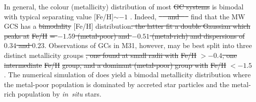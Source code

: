 \documentclass[a4paper,fleqn,usenatbib]{mnras}
\providecommand{\DIFadd}[1]{{\protect\color{blue}\uwave{#1}}} %
\providecommand{\DIFdel}[1]{{\protect\color{red}\sout{#1}}}                      %
\providecommand{\DIFaddbegin}{} %
\providecommand{\DIFaddend}{} %
\providecommand{\DIFdelbegin}{} %
\providecommand{\DIFdelend}{} %
\newcommand{\DIFscaledelfig}{0.5}
\newlength{\DIFdelgraphicswidth} %
\newlength{\DIFdelgraphicsheight} %
\newcommand{\DIFaddincludegraphics}[2][]{{\color{blue}\fbox{\DIFOincludegraphics[#1]{#2}}}} %
\newcommand{\DIFdelincludegraphics}[2][]{%
\sbox{\DIFdelgraphicsbox}{\DIFOincludegraphics[#1]{#2}}%
\settoboxwidth{\DIFdelgraphicswidth}{\DIFdelgraphicsbox} %
\settoboxtotalheight{\DIFdelgraphicsheight}{\DIFdelgraphicsbox} %
\scalebox{\DIFscaledelfig}{%
\parbox[b]{\DIFdelgraphicswidth}{\usebox{\DIFdelgraphicsbox}\\[-\baselineskip] \rule{\DIFdelgraphicswidth}{0em}}\llap{\resizebox{\DIFdelgraphicswidth}{\DIFdelgraphicsheight}{%
\setlength{\unitlength}{\DIFdelgraphicswidth}%
\begin{picture}(1,1)%
\thicklines\linethickness{2pt} %
{\color[rgb]{1,0,0}\put(0,0){\framebox(1,1){}}}%
{\color[rgb]{1,0,0}\put(0,0){\line( 1,1){1}}}%
{\color[rgb]{1,0,0}\put(0,1){\line(1,-1){1}}}%
\end{picture}%
}\hspace*{3pt}}} %
} %
\DeclareRobustCommand{\DIFaddbegin}{\DIFOaddbegin \let\includegraphics\DIFaddincludegraphics} %
\DeclareRobustCommand{\DIFaddend}{\DIFOaddend \let\includegraphics\DIFOincludegraphics} %
\DeclareRobustCommand{\DIFdelbegin}{\DIFOdelbegin \let\includegraphics\DIFdelincludegraphics} %
\DeclareRobustCommand{\DIFdelend}{\DIFOaddend \let\includegraphics\DIFOincludegraphics} %
\begin{document}
In general, the colour (metallicity) distribution of most \DIFdelbegin \DIFdel{GC systems }\DIFdelend \DIFaddbegin \DIFadd{GCSs }\DIFaddend is bimodal 
with typical separating value [Fe/H]$\sim -1$ \citep{1985ApJ...293..424Z,
1999AJ....118.1526G,2001AJ....121.2974L,2006ApJ...639...95P}. Indeed, 
\DIFdelbegin \DIFdel{\mbox{%
\citet[][p. 234]{1998gcs..book.....A} }\hspace{0pt}%
and \mbox{%
\citet[][p. 38]{Harris2001} }\hspace{0pt}%
}\DIFdelend \DIFaddbegin \DIFadd{\mbox{%
\citet{1998gcs..book.....A} }\hspace{0pt}%
and \mbox{%
\citet{Harris2001} }\hspace{0pt}%
}\DIFaddend find that the MW GCS has a 
\DIFdelbegin \DIFdel{bimodality }\DIFdelend \DIFaddbegin \DIFadd{bimodal }\DIFaddend [Fe/H] distribution\DIFdelbegin \DIFdel{: the latter fit a double Gaussian 
which peaks at }%
\DIFdel{Fe/H}%
\DIFdel{= $-1.59$ (metal-poor) and $-0.51$ (metal-rich) and 
dispersions of $0.34$ and $0.23$}\DIFdelend . Observations of GCs in M31, however, may be best 
split into three distinct metallicity groups \DIFdelbegin \DIFdel{, one found at small radii with 
}%
\DIFdel{Fe/H}%
\DIFdel{$>-0.4$, one intermediate }%
\DIFdel{Fe/H}%
\DIFdel{group, and a dominant (metal-poor) group 
with }%
\DIFdel{Fe/H}%
\DIFdel{$< -1.5$ }\DIFdelend \citep{2016ApJ...824...42C}. The 
numerical simulation of \citet{2017MNRAS.465.3622R} does yield a bimodal 
metallicity distribution where the metal-poor population is dominated by accreted 
star particles and the metal-rich population by {\it in~situ} stars. 
\end{document}
